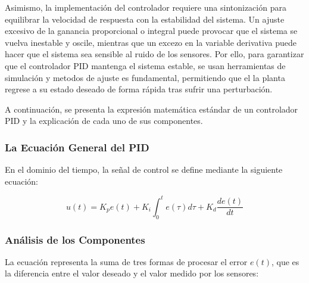 \documentclass[12pt,letterpaper]{report}
\begin{document}
Asimismo, la implementación del controlador requiere una sintonización para equilibrar la velocidad de respuesta con la estabilidad del sistema. Un ajuste excesivo de la ganancia proporcional o integral puede provocar que el sistema se vuelva inestable y oscile, mientras que un excezo en la variable derivativa puede hacer que el sistema sea sensible al ruido de los sensores. Por ello, para garantizar que el controlador PID mantenga el sistema estable, se usan herramientas de simulación y metodos de ajuste es fundamental, permitiendo que el la planta regrese a su estado deseado de forma rápida tras sufrir una perturbación.

A continuación, se presenta la expresión matemática estándar de un controlador PID y la explicación de cada uno de sus componentes.

\subsubsection{La Ecuación General del PID}

En el dominio del tiempo, la señal de control se define mediante la siguiente ecuación:

\begin{equation}
u(t) = K_p e(t) + K_i \int_{0}^{t} e(\tau)d\tau + K_d \frac{de(t)}{dt}
\end{equation}

\subsubsection{Análisis de los Componentes}

La ecuación representa la suma de tres formas de procesar el error $e(t)$, que es la diferencia entre el valor deseado y el valor medido por los sensores:
\end{document}
